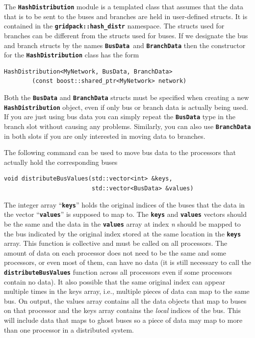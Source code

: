 \documentclass[12pt]{report} %
\begin{document}
The \texttt{\textbf{HashDistribution}} module is a templated class that assumes that the data that is to be sent to the buses and branches are held in user-defined structs. It is contained in the \texttt{\textbf{gridpack::hash\_distr}} namespace. The structs used for branches can be different from the structs used for buses. If we designate the bus and branch structs by the names \texttt{\textbf{BusData }}and \texttt{\textbf{BranchData}} then the constructor for the \texttt{\textbf{HashDistribution}} class has the form

{
\color{red}
\begin{Verbatim}[fontseries=b]
HashDistribution<MyNetwork, BusData, BranchData>
        (const boost::shared_ptr<MyNetwork> network)
\end{Verbatim}
}

Both the \texttt{\textbf{BusData}} and \texttt{\textbf{BranchData}} structs must be specified when creating a new \texttt{\textbf{HashDistribution}} object, even if only bus or branch data is actually being used. If you are just using bus data you can simply repeat the \texttt{\textbf{BusData}} type in the branch slot without causing any problems. Similarly, you can also use \texttt{\textbf{BranchData}} in both slots if you are only interested in moving data to branches.

The following command can be used to move bus data to the processors that actually hold the corresponding buses

{
\color{red}
\begin{Verbatim}[fontseries=b]
void distributeBusValues(std::vector<int> &keys,
                         std::vector<BusData> &values)
\end{Verbatim}
}

The integer array ``\texttt{\textbf{keys}}'' holds the original indices of the buses that the data in the vector ``\texttt{\textbf{values}}'' is supposed to map to. The \texttt{\textbf{keys}} and \texttt{\textbf{values}} vectors should be the same and the data in the \texttt{\textbf{values}} array at index \textit{n} should be mapped to the bus indicated by the original index stored at the same location in the \texttt{\textbf{keys}} array. This function is collective and must be called on all processors. The amount of data on each processor does not need to be the same and some processors, or even most of them, can have no data (it is still necessary to call the \texttt{\textbf{distributeBusValues}} function across all processors even if some processors contain no data). It also possible that the same original index can appear multiple times in the keys array, i.e., multiple pieces of data can map to the same bus. On output, the values array contains all the data objects that map to buses on that processor and the keys array contains the \textit{local} indices of the bus. This will include data that maps to ghost buses so a piece of data may map to more than one processor in a distributed system.
\end{document}
